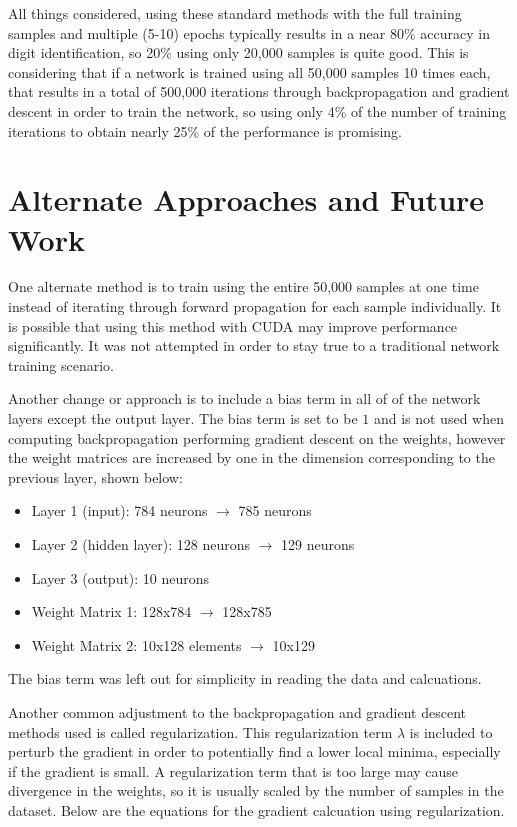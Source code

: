 \documentclass[11pt]{article}
\begin{document}
All things considered, using these standard methods with the full training samples and multiple (5-10) epochs typically results in a near 80\% accuracy in digit identification, so 20\% using only 20,000 samples is quite good. This is considering that if a network is trained using all 50,000 samples 10 times each, that results in a total of 500,000 iterations through backpropagation and gradient descent in order to train the network, so using only 4\% of the number of training iterations to obtain nearly 25\% of the performance is promising.

\section{Alternate Approaches and Future Work}
One alternate method is to train using the entire 50,000 samples at one time instead of iterating through forward propagation for each sample individually. It is possible that using this method with CUDA may improve performance significantly. It was not attempted in order to stay true to a traditional network training scenario.

Another change or approach is to include a bias term in all of of the network layers except the output layer. The bias term is set to be $1$ and is not used when computing backpropagation performing gradient descent on the weights, however the weight matrices are increased by one in the dimension corresponding to the previous layer, shown below:

\begin{itemize}
	\item Layer 1 (input): 784 neurons $\rightarrow$ 785 neurons
	\item Layer 2 (hidden layer): 128 neurons $\rightarrow$ 129 neurons
	\item Layer 3 (output): 10 neurons
	\item Weight Matrix 1: 128x784 $\rightarrow$ 128x785
	\item Weight Matrix 2: 10x128 elements $\rightarrow$ 10x129
\end{itemize}

The bias term was left out for simplicity in reading the data and calcuations.

Another common adjustment to the backpropagation and gradient descent methods used is called regularization. This regularization term $\lambda$ is included to perturb the gradient in order to potentially find a lower local minima, especially if the gradient is small. A regularization term that is too large may cause divergence in the weights, so it is usually scaled by the number of samples in the dataset. Below are the equations for the gradient calcuation using regularization. 
\end{document}
